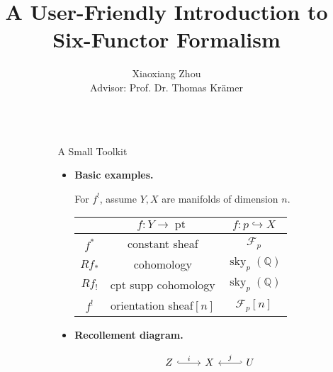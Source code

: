 \documentclass[final]{beamer}
\title{A User-Friendly Introduction to Six-Functor Formalism}
\author{Xiaoxiang Zhou \\ Advisor: Prof. Dr. Thomas Krämer}
\institute[shortinst]{Humboldt-Universität zu Berlin}
\newlength{\sepwidth}
\newlength{\colwidth}
\newcommand{\separatorcolumn}{\begin{column}{\sepwidth}\end{column}}
\DeclareMathOperator{\sky}{\operatorname{sky}}
\DeclareMathOperator{\pt}{\operatorname{pt}}
\begin{document}
\begin{frame}[t]
\begin{columns}[t]
\separatorcolumn

\begin{column}{\colwidth}



  \begin{block}{A Small Toolkit}
  \begin{itemize}
  \item \textbf{Basic examples.}
  
    For $f^!$, assume $Y,X$ are manifolds of dimension $n$.
    {
  \renewcommand{\arraystretch}{1.2}
  \renewcommand{\tabcolsep}{5mm}
   \begin{table}[]
   \centering
   \begin{tabular}{c|c|c}
  \hline
    & $f:Y \longrightarrow \pt$ & $f: p \hookrightarrow X$ \\ \hline
   $f^*$ & constant sheaf & $\mathcal{F}_p$ \\ \hline
   $Rf_*$ & cohomology & $\sky_p(\mathbb{Q})$ \\ \hline
   $Rf_!$ & cpt supp cohomology & $\sky_p(\mathbb{Q})$ \\ \hline
   $f^!$ & orientation sheaf$[n]$ &  $\mathcal{F}_p[n]$ \\ \hline
   \end{tabular}
   \end{table}
   }
  
  
  \item \textbf{Recollement diagram.}
  
  \[\begin{tikzcd}[ampersand replacement=\&]
  	Z \& X \& U
  	\arrow["i", hook, from=1-1, to=1-2]
  	\arrow["j"', hook', from=1-3, to=1-2]
  \end{tikzcd}\]
  

\end{itemize}
\end{block}
\end{column}
\end{columns}
\end{frame}
\end{document}
